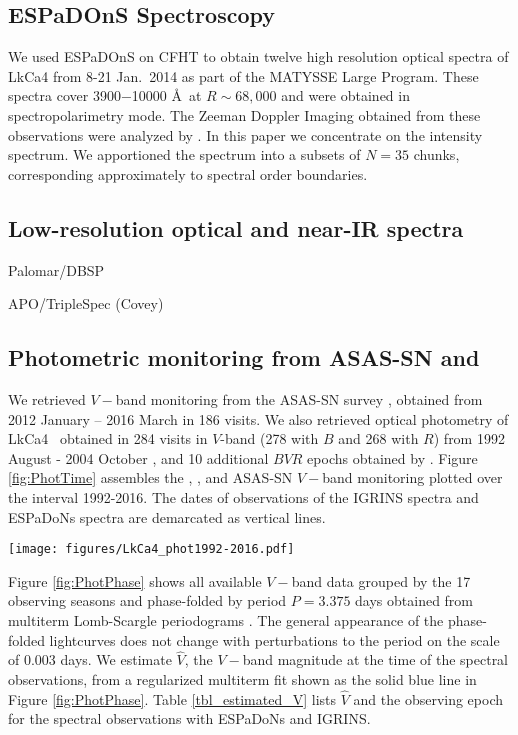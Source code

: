 \documentclass[twocolumn]{emulateapj}%
\newcommand{\name}{LkCa4 }
\begin{document}
\subsection{ESPaDOnS Spectroscopy}
We used ESPaDOnS on CFHT to obtain twelve high resolution optical spectra of \name from 8-21 Jan.~2014 as part of the MATYSSE Large Program.  These spectra cover 3900$-$10000 \AA\ at $R\sim68,000$ and were obtained in spectropolarimetry mode.  The Zeeman Doppler Imaging obtained from these observations were analyzed by \citet{donati14}.  In this paper we concentrate on the intensity spectrum.  We apportioned the spectrum into a subsets of $N=35$ chunks, corresponding approximately to spectral order boundaries.


\subsection{Low-resolution optical and near-IR spectra}

Palomar/DBSP \citep{herczeg14}

APO/TripleSpec (Covey)


\subsection{Photometric monitoring from ASAS-SN and \citet{grankin08}}

We retrieved $V-$band monitoring from the ASAS-SN survey \citep{shappee14}, obtained from 2012 January -- 2016 March in 186 visits.
We also retrieved optical photometry of \name\ obtained in 284 visits in $V$-band (278 with $B$ and 268 with $R$) from 1992 August - 2004 October \citep{grankin08}, and 10 additional $BVR$ epochs obtained by \citet{donati14}.   Figure \ref{fig:PhotTime} assembles the \citet{grankin08}, \citet{donati14}, and ASAS-SN $V-$band monitoring plotted over the interval 1992-2016.  The dates of observations of the IGRINS spectra and ESPaDoNs spectra are demarcated as vertical lines.


\begin{figure*}
	\centering
	\texttt{[image: figures/LkCa4\_phot1992-2016.pdf]}
	\caption{\name $V-$band photometric monitoring from 1992-2016.}
	\label{fig:PhotTime}
\end{figure*}

Figure \ref{fig:PhotPhase} shows all available $V-$band data grouped by the 17 observing seasons and phase-folded by period $P=3.375$ days obtained from multiterm Lomb-Scargle periodograms \citep{ivezic14}.  The general appearance of the phase-folded lightcurves does not change with perturbations to the period on the scale of 0.003 days.  We estimate $\hat V$, the $V-$band magnitude at the time of the spectral observations, from a regularized multiterm fit \citep{vanderplas15a} shown as the solid blue line in Figure \ref{fig:PhotPhase}.  Table \ref{tbl_estimated_V} lists $\hat V$ and the observing epoch for the spectral observations with ESPaDoNs and IGRINS.
\end{document}
